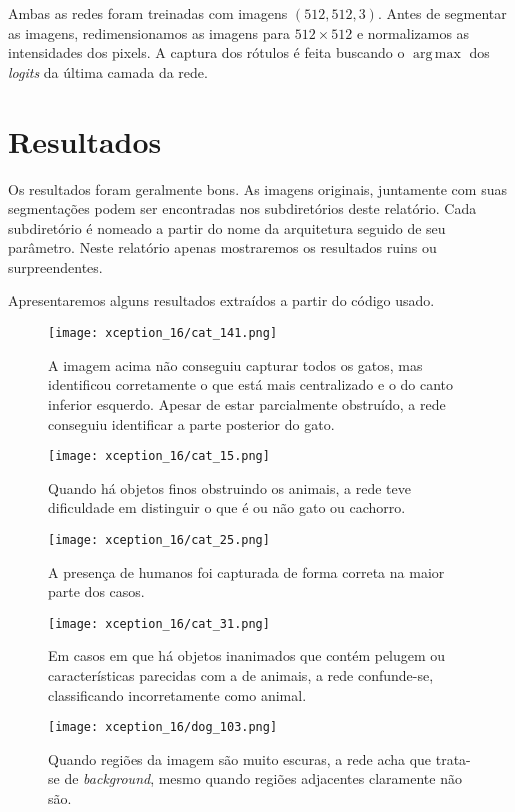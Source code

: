 \documentclass[12pt]{article}
\DeclareMathOperator*{\argmax}{arg\,max}
\theoremstyle{plain}
\numberwithin{equation}{section}
\begin{document}
Ambas as redes foram treinadas com imagens $(512, 512, 3)$. Antes de segmentar as imagens,
redimensionamos as imagens para $512\times 512$ e normalizamos as intensidades dos pixels. A
captura dos rótulos é feita buscando o $\argmax$ dos \textit{logits} da última camada da rede.

\section{Resultados}

Os resultados foram geralmente bons. As imagens originais, juntamente com suas segmentações podem
ser encontradas nos subdiretórios deste relatório. Cada subdiretório é nomeado a partir do nome da
arquitetura seguido de seu parâmetro. Neste relatório apenas mostraremos os resultados ruins ou
surpreendentes.

Apresentaremos alguns resultados extraídos a partir do código usado.

\begin{figure}[H]
  \texttt{[image: xception\_16/cat\_141.png]}
  \caption{A imagem acima não conseguiu capturar todos os gatos, mas identificou corretamente o que está mais
  centralizado e o do canto inferior esquerdo. Apesar de estar parcialmente obstruído, a rede
  conseguiu identificar a parte posterior do gato.}
\end{figure}

\begin{figure}[H]
  \texttt{[image: xception\_16/cat\_15.png]}
  \caption{Quando há objetos finos obstruindo os animais, a rede teve dificuldade em distinguir o que é ou não
  gato ou cachorro.}
\end{figure}

\begin{figure}[H]
  \texttt{[image: xception\_16/cat\_25.png]}
  \caption{A presença de humanos foi capturada de forma correta na maior parte dos casos.}
\end{figure}

\begin{figure}[H]
  \texttt{[image: xception\_16/cat\_31.png]}
  \caption{Em casos em que há objetos inanimados que contém pelugem ou características parecidas
  com a de animais, a rede confunde-se, classificando incorretamente como animal.}
\end{figure}

\begin{figure}[H]
  \texttt{[image: xception\_16/dog\_103.png]}
  \caption{Quando regiões da imagem são muito escuras, a rede acha que trata-se de
  \textit{background}, mesmo quando regiões adjacentes claramente não são.}
\end{figure}
\end{document}

